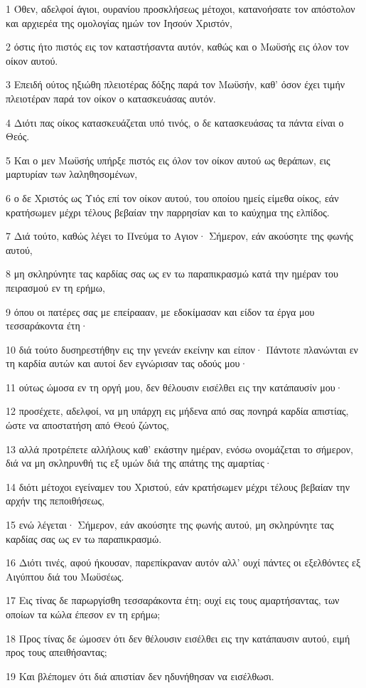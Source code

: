 \par 1 Όθεν, αδελφοί άγιοι, ουρανίου προσκλήσεως μέτοχοι, κατανοήσατε τον απόστολον και αρχιερέα της ομολογίας ημών τον Ιησούν Χριστόν,
\par 2 όστις ήτο πιστός εις τον καταστήσαντα αυτόν, καθώς και ο Μωϋσής εις όλον τον οίκον αυτού.
\par 3 Επειδή ούτος ηξιώθη πλειοτέρας δόξης παρά τον Μωϋσήν, καθ' όσον έχει τιμήν πλειοτέραν παρά τον οίκον ο κατασκευάσας αυτόν.
\par 4 Διότι πας οίκος κατασκευάζεται υπό τινός, ο δε κατασκευάσας τα πάντα είναι ο Θεός.
\par 5 Και ο μεν Μωϋσής υπήρξε πιστός εις όλον τον οίκον αυτού ως θεράπων, εις μαρτυρίαν των λαληθησομένων,
\par 6 ο δε Χριστός ως Υιός επί τον οίκον αυτού, του οποίου ημείς είμεθα οίκος, εάν κρατήσωμεν μέχρι τέλους βεβαίαν την παρρησίαν και το καύχημα της ελπίδος.
\par 7 Διά τούτο, καθώς λέγει το Πνεύμα το Αγιον· Σήμερον, εάν ακούσητε της φωνής αυτού,
\par 8 μη σκληρύνητε τας καρδίας σας ως εν τω παραπικρασμώ κατά την ημέραν του πειρασμού εν τη ερήμω,
\par 9 όπου οι πατέρες σας με επείραααν, με εδοκίμασαν και είδον τα έργα μου τεσσαράκοντα έτη·
\par 10 διά τούτο δυσηρεστήθην εις την γενεάν εκείνην και είπον· Πάντοτε πλανώνται εν τη καρδία αυτών και αυτοί δεν εγνώρισαν τας οδούς μου·
\par 11 ούτως ώμοσα εν τη οργή μου, δεν θέλουσιν εισέλθει εις την κατάπαυσίν μου·
\par 12 προσέχετε, αδελφοί, να μη υπάρχη εις μήδενα από σας πονηρά καρδία απιστίας, ώστε να αποστατήση από Θεού ζώντος,
\par 13 αλλά προτρέπετε αλλήλους καθ' εκάστην ημέραν, ενόσω ονομάζεται το σήμερον, διά να μη σκληρυνθή τις εξ υμών διά της απάτης της αμαρτίας·
\par 14 διότι μέτοχοι εγείναμεν του Χριστού, εάν κρατήσωμεν μέχρι τέλους βεβαίαν την αρχήν της πεποιθήσεως,
\par 15 ενώ λέγεται· Σήμερον, εάν ακούσητε της φωνής αυτού, μη σκληρύνητε τας καρδίας σας ως εν τω παραπικρασμώ.
\par 16 Διότι τινές, αφού ήκουσαν, παρεπίκραναν αυτόν αλλ' ουχί πάντες οι εξελθόντες εξ Αιγύπτου διά του Μωϋσέως.
\par 17 Εις τίνας δε παρωργίσθη τεσσαράκοντα έτη; ουχί εις τους αμαρτήσαντας, των οποίων τα κώλα έπεσον εν τη ερήμω;
\par 18 Προς τίνας δε ώμοσεν ότι δεν θέλουσιν εισέλθει εις την κατάπαυσιν αυτού, ειμή προς τους απειθήσαντας;
\par 19 Και βλέπομεν ότι διά απιστίαν δεν ηδυνήθησαν να εισέλθωσι.

